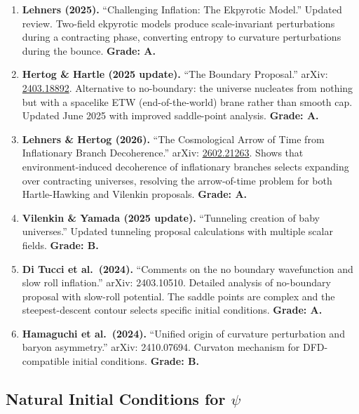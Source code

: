 \documentclass[11pt,a4paper]{article}
\begin{document}
\begin{enumerate}
\item \textbf{Lehners (2025).} ``Challenging Inflation: The Ekpyrotic Model.'' Updated review. Two-field ekpyrotic models produce scale-invariant perturbations during a contracting phase, converting entropy to curvature perturbations during the bounce. \textbf{Grade: A.}

\item \textbf{Hertog \& Hartle (2025 update).} ``The Boundary Proposal.'' arXiv: \href{https://arxiv.org/abs/2403.18892}{2403.18892}. Alternative to no-boundary: the universe nucleates from nothing but with a spacelike ETW (end-of-the-world) brane rather than smooth cap. Updated June 2025 with improved saddle-point analysis. \textbf{Grade: A.}

\item \textbf{Lehners \& Hertog (2026).} ``The Cosmological Arrow of Time from Inflationary Branch Decoherence.'' arXiv: \href{https://arxiv.org/abs/2602.21263}{2602.21263}. Shows that environment-induced decoherence of inflationary branches selects expanding over contracting universes, resolving the arrow-of-time problem for both Hartle-Hawking and Vilenkin proposals. \textbf{Grade: A.}

\item \textbf{Vilenkin \& Yamada (2025 update).} ``Tunneling creation of baby universes.'' Updated tunneling proposal calculations with multiple scalar fields. \textbf{Grade: B.}

\item \textbf{Di Tucci et al.\ (2024).} ``Comments on the no boundary wavefunction and slow roll inflation.'' arXiv: 2403.10510. Detailed analysis of no-boundary proposal with slow-roll potential. The saddle points are complex and the steepest-descent contour selects specific initial conditions. \textbf{Grade: A.}

\item \textbf{Hamaguchi et al.\ (2024).} ``Unified origin of curvature perturbation and baryon asymmetry.'' arXiv: 2410.07694. Curvaton mechanism for DFD-compatible initial conditions. \textbf{Grade: B.}
\end{enumerate}

\subsection{Natural Initial Conditions for $\psi$}
\end{document}
